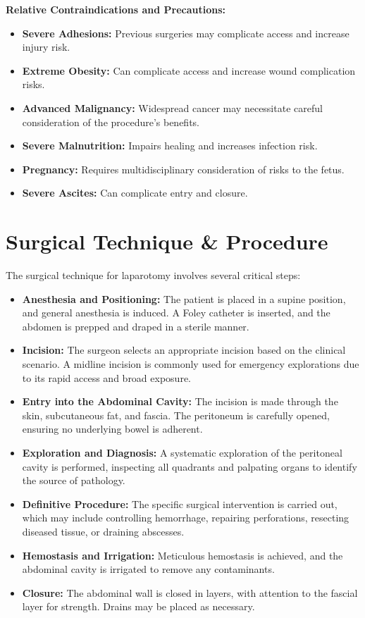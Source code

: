 \textbf{Relative Contraindications and Precautions:}
\begin{itemize}
  \item \textbf{Severe Adhesions:} Previous surgeries may complicate access and increase injury risk.
  \item \textbf{Extreme Obesity:} Can complicate access and increase wound complication risks.
  \item \textbf{Advanced Malignancy:} Widespread cancer may necessitate careful consideration of the procedure's benefits.
  \item \textbf{Severe Malnutrition:} Impairs healing and increases infection risk.
  \item \textbf{Pregnancy:} Requires multidisciplinary consideration of risks to the fetus.
  \item \textbf{Severe Ascites:} Can complicate entry and closure.
\end{itemize}

\section*{Surgical Technique \& Procedure}
The surgical technique for laparotomy involves several critical steps:

\begin{itemize}
  \item \textbf{Anesthesia and Positioning:} The patient is placed in a supine position, and general anesthesia is induced. A Foley catheter is inserted, and the abdomen is prepped and draped in a sterile manner.

  \item \textbf{Incision:} The surgeon selects an appropriate incision based on the clinical scenario. A midline incision is commonly used for emergency explorations due to its rapid access and broad exposure.

  \item \textbf{Entry into the Abdominal Cavity:} The incision is made through the skin, subcutaneous fat, and fascia. The peritoneum is carefully opened, ensuring no underlying bowel is adherent.

  \item \textbf{Exploration and Diagnosis:} A systematic exploration of the peritoneal cavity is performed, inspecting all quadrants and palpating organs to identify the source of pathology.

  \item \textbf{Definitive Procedure:} The specific surgical intervention is carried out, which may include controlling hemorrhage, repairing perforations, resecting diseased tissue, or draining abscesses.

  \item \textbf{Hemostasis and Irrigation:} Meticulous hemostasis is achieved, and the abdominal cavity is irrigated to remove any contaminants.

  \item \textbf{Closure:} The abdominal wall is closed in layers, with attention to the fascial layer for strength. Drains may be placed as necessary.
\end{itemize}

